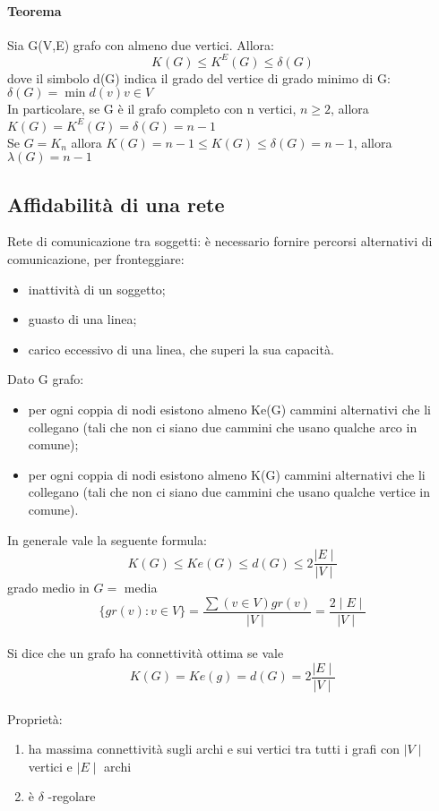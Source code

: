 \paragraph{Teorema} Sia G(V,E) grafo con almeno due vertici. Allora:
\[ K(G) \leq K^E(G) \leq \delta(G) \]
dove il simbolo d(G) indica il grado del vertice di grado minimo di G: \(\delta(G) = \min {d(v) v \in V} \)  \\
In particolare, se G è il grafo completo con n vertici, $n \geq 2$, allora \(K(G) = K^E(G) = \delta(G) =n-1\) \\
Se $G = K_n$ allora \(K(G) = n-1 \leq  K(G) \leq \delta(G) = n-1\), allora \(\lambda(G) =n-1 \) \\

\subsection{Affidabilità di una rete}

Rete di comunicazione tra soggetti: è necessario fornire percorsi alternativi di comunicazione, per fronteggiare:
\begin{itemize}
\item inattività di un soggetto;
\item guasto di una linea;
\item carico eccessivo di una linea, che superi la sua capacità.
\end{itemize}
Dato G grafo:
\begin{itemize}
\item per ogni coppia di nodi esistono almeno Ke(G) cammini alternativi che li collegano (tali che non ci
siano due cammini che usano qualche arco in comune);
\item per ogni coppia di nodi esistono almeno K(G) cammini alternativi che li collegano (tali che non ci
siano due cammini che usano qualche vertice in comune).
\end{itemize}
In generale vale la seguente formula: \\
\[K(G) \leq Ke(G) \leq d(G) \leq 2 \frac{ \mid E \mid}{\mid V \mid} \] grado medio in $G =$ media \[ \{ gr(v) : v \in V \} = \frac{\sum(v \in V) gr(v)}{ \mid V \mid} = \frac{2 \mid E \mid}{\mid V \mid} \] \\
Si dice che un grafo ha connettività ottima se vale \[ K(G) = Ke(g) = d(G) = 2 \frac{\mid E \mid}{\mid V \mid} \] \\
Proprietà:
\begin{enumerate}
\item ha massima connettività sugli archi e sui vertici tra tutti i grafi con $\mid V \mid$ vertici e $\mid E \mid$ archi
\item è $\delta$ -regolare
\end{enumerate}

